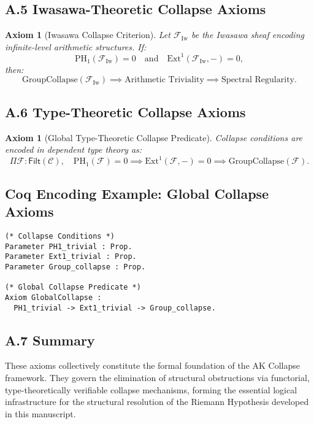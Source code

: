 \documentclass[11pt]{article}
\newtheorem{axiom}[theorem]{Axiom}
\begin{document}
\subsection*{A.5 Iwasawa-Theoretic Collapse Axioms}

\begin{axiom}[Iwasawa Collapse Criterion]
Let $\mathcal{F}_{\mathrm{Iw}}$ be the Iwasawa sheaf encoding infinite-level arithmetic structures. If:
\[
\mathrm{PH}_1(\mathcal{F}_{\mathrm{Iw}}) = 0 \quad \text{and} \quad \mathrm{Ext}^1(\mathcal{F}_{\mathrm{Iw}}, -) = 0,
\]
then:
\[
\mathrm{GroupCollapse}(\mathcal{F}_{\mathrm{Iw}}) \implies \text{Arithmetic Triviality} \implies \text{Spectral Regularity}.
\]
\end{axiom}

\subsection*{A.6 Type-Theoretic Collapse Axioms}

\begin{axiom}[Global Type-Theoretic Collapse Predicate]
Collapse conditions are encoded in dependent type theory as:
\[
\Pi \mathcal{F} : \mathsf{Filt}(\mathcal{C}), \quad 
\mathrm{PH}_1(\mathcal{F}) = 0 \implies 
\mathrm{Ext}^1(\mathcal{F}, -) = 0 \implies 
\mathrm{GroupCollapse}(\mathcal{F}).
\]
\end{axiom}

\subsection*{Coq Encoding Example: Global Collapse Axioms}

\begin{lstlisting}[language=Coq, caption=Coq Formalization of Global Collapse Axioms, captionpos=b]
(* Collapse Conditions *)
Parameter PH1_trivial : Prop.
Parameter Ext1_trivial : Prop.
Parameter Group_collapse : Prop.

(* Global Collapse Predicate *)
Axiom GlobalCollapse :
  PH1_trivial -> Ext1_trivial -> Group_collapse.
\end{lstlisting}

\subsection*{A.7 Summary}

These axioms collectively constitute the formal foundation of the AK Collapse framework. They govern the elimination of structural obstructions via functorial, type-theoretically verifiable collapse mechanisms, forming the essential logical infrastructure for the structural resolution of the Riemann Hypothesis developed in this manuscript.
\end{document}
